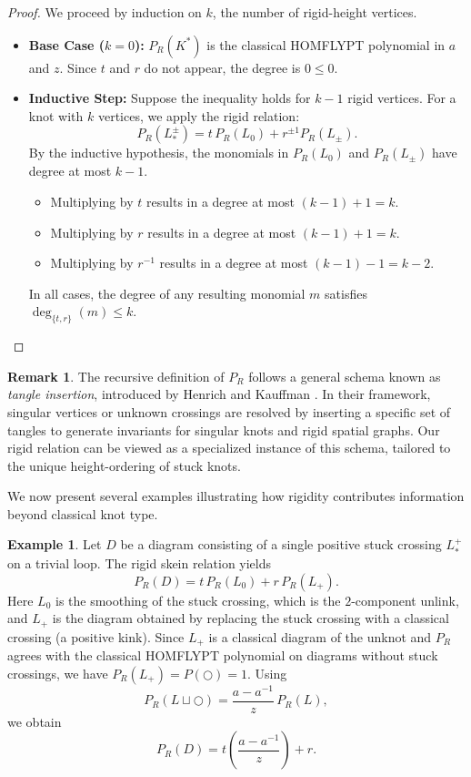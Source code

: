 \documentclass[11pt,a4paper]{article}
\theoremstyle{plain}
\theoremstyle{definition}
\newtheorem{example}[theorem]{Example}
\newtheorem{remark}[theorem]{Remark}
\begin{document}
\begin{proof}
We proceed by induction on $k$, the number of rigid-height vertices.
\begin{itemize}
    \item \textbf{Base Case ($k=0$):} $P_R(K^*)$ is the classical HOMFLYPT polynomial in $a$ and $z$. Since $t$ and $r$ do not appear, the degree is $0 \le 0$.
    \item \textbf{Inductive Step:} Suppose the inequality holds for $k-1$ rigid vertices. For a knot with $k$ vertices, we apply the rigid relation:
    \[
    P_R(L_{\ast}^{\pm}) = t\,P_R(L_0) + r^{\pm 1}P_R(L_{\pm}).
    \]
    By the inductive hypothesis, the monomials in $P_R(L_0)$ and $P_R(L_{\pm})$ have degree at most $k-1$. 
    \begin{itemize}
        \item Multiplying by $t$ results in a degree at most $(k-1) + 1 = k$.
        \item Multiplying by $r$ results in a degree at most $(k-1) + 1 = k$.
        \item Multiplying by $r^{-1}$ results in a degree at most $(k-1) - 1 = k-2$.
    \end{itemize}
    In all cases, the degree of any resulting monomial $m$ satisfies $\deg_{\{t, r\}}(m) \le k$.
\end{itemize}
\end{proof}


\begin{remark}
The recursive definition of $P_R$ follows a general schema known as \emph{tangle insertion}, introduced by Henrich and Kauffman \cite{HenrichKauffman2017}. In their framework, singular vertices or unknown crossings are resolved by inserting a specific set of tangles to generate invariants for singular knots and rigid spatial graphs. Our rigid relation can be viewed as a specialized instance of this schema, tailored to the unique height-ordering of stuck knots.
\end{remark}


We now present several examples illustrating how rigidity contributes information beyond classical knot type.


\begin{example}\label{curl_stuck_hom}
Let $D$ be a diagram consisting of a single positive stuck crossing $L_{\ast}^{+}$ on a trivial loop. The rigid skein relation yields
\[
P_R(D) = t\,P_R(L_0) + r\,P_R(L_+).
\]
Here $L_0$ is the smoothing of the stuck crossing, which is the $2$-component unlink, and $L_+$ is the diagram obtained by replacing the stuck crossing with a classical crossing (a positive kink). Since $L_+$ is a classical diagram of the unknot and $P_R$ agrees with the classical HOMFLYPT polynomial on diagrams without stuck crossings, we have $P_R(L_+)=P(\bigcirc)=1$. Using
\[
P_R(L\sqcup \bigcirc)=\frac{a-a^{-1}}{z}\,P_R(L),
\]
we obtain
\[
P_R(D) = t \left( \frac{a - a^{-1}}{z} \right) + r.
\]
\end{example}
\end{document}
